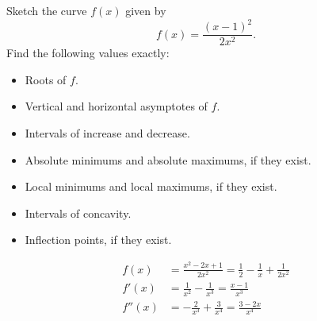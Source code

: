 \documentclass[11pt, addpoints]{exam}
\begin{document}
\begin{questions}

\question[40] Sketch the curve $f(x)$ given by
\[f(x) = \frac{(x-1)^2}{2x^2}.\]
Find the following values exactly:
\begin{itemize}
    \item Roots of $f$.
    \item Vertical and horizontal asymptotes of $f$.
    \item Intervals of increase and decrease.
    \item Absolute minimums and absolute maximums, if they exist.
    \item Local minimums and local maximums, if they exist.
    \item Intervals of concavity.
    \item Inflection points, if they exist.
\end{itemize}

\begin{align*}
    f(x) & = \frac{x^2-2x+1}{2x^2} = \frac{1}{2} - \frac{1}{x} + \frac{1}{2x^2}\\
    f'(x) & = \frac{1}{x^2} - \frac{1}{x^3} = \frac{x-1}{x^3} \\
    f''(x) & = -\frac{2}{x^3} + \frac{3}{x^4} = \frac{3-2x}{x^4}
\end{align*}


\end{questions}
\end{document}
